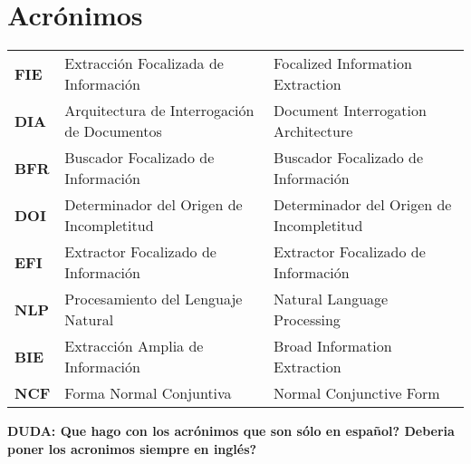 \chapter*{Acrónimos}

\newcommand{\TERM}[3]{
	\textbf{#1} & #3 & #2 \\[5pt]
}

\begin{longtable}{p{1in}p{2.2in}p{3in}}

		\TERM{FIE}{Focalized Information Extraction}{Extracción Focalizada de Información}
		\TERM{DIA}{Document Interrogation Architecture}{Arquitectura de Interrogación de Documentos}
		\TERM{BFR}{Buscador Focalizado de Información}{Buscador Focalizado de Información}
		\TERM{DOI}{Determinador del Origen de Incompletitud}{Determinador del Origen de Incompletitud}		
		\TERM{EFI}{Extractor Focalizado de Información}{Extractor Focalizado de Información}
		\TERM{NLP}{Natural Language Processing}{Procesamiento del Lenguaje Natural}				
		\TERM{BIE}{Broad Information Extraction}{Extracción Amplia de Información}				
		\TERM{NCF}{Normal Conjunctive Form}{Forma Normal Conjuntiva}		

\end{longtable}

		\textbf{DUDA: Que hago con los acrónimos que son sólo en español? Deberia poner los acronimos siempre en inglés?}
		
\newpage
